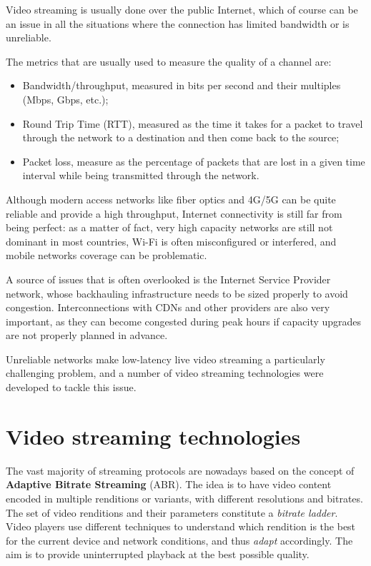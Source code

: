 Video streaming is usually done over the public Internet, which of course can be an issue in all the situations where the connection has limited bandwidth or is unreliable.

The metrics that are usually used to measure the quality of a channel are:

\begin{itemize}
    \item Bandwidth/throughput, measured in bits per second and their multiples (Mbps, Gbps, etc.);
    \item Round Trip Time (RTT), measured as the time it takes for a packet to travel through the network to a destination and then come back to the source;
    \item Packet loss, measure as the percentage of packets that are lost in a given time interval while being transmitted through the network.
\end{itemize}

Although modern access networks like fiber optics and 4G/5G can be quite reliable and provide a high throughput, Internet connectivity is still far from being perfect: as a matter of fact, very high capacity networks are still not dominant in most countries, Wi-Fi is often misconfigured or interfered, and mobile networks coverage can be problematic.


A source of issues that is often overlooked is the Internet Service Provider network, whose backhauling infrastructure needs to be sized properly to avoid congestion. Interconnections with CDNs and other providers are also very important, as they can become congested during peak hours if capacity upgrades are not properly planned in advance.

Unreliable networks make low-latency live video streaming a particularly challenging problem, and a number of video streaming technologies were developed to tackle this issue.

\section{Video streaming technologies}
\label{sec:intro/technologies}


The vast majority of streaming protocols are nowadays based on the concept of \textbf{Adaptive Bitrate Streaming} (ABR). The idea is to have video content encoded in multiple renditions or variants, with different resolutions and bitrates. The set of video renditions and their parameters constitute a \textit{bitrate ladder}. Video players use different techniques to understand which rendition is the best for the current device and network conditions, and thus \textit{adapt} accordingly. The aim is to provide uninterrupted playback at the best possible quality.

